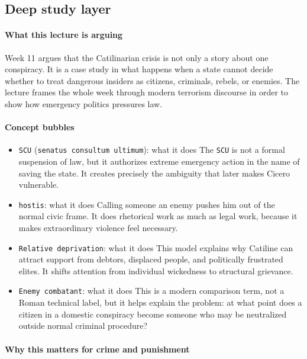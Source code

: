 \documentclass[11pt]{article}
\begin{document}
\subsection{Deep study layer}

\paragraph{What this lecture is arguing}

Week 11 argues that the Catilinarian crisis is not only a story about one conspiracy. It is a case study in what happens when a state cannot decide whether to treat dangerous insiders as citizens, criminals, rebels, or enemies. The lecture frames the whole week through modern terrorism discourse in order to show how emergency politics pressures law.

\paragraph{Concept bubbles}

\begin{itemize}
\item \texttt{SCU} (\texttt{senatus consultum ultimum}): what it does The \texttt{SCU} is not a formal suspension of law, but it authorizes extreme emergency action in the name of saving the state. It creates precisely the ambiguity that later makes Cicero vulnerable.
\item \texttt{hostis}: what it does Calling someone an enemy pushes him out of the normal civic frame. It does rhetorical work as much as legal work, because it makes extraordinary violence feel necessary.
\item \texttt{Relative deprivation}: what it does This model explains why Catiline can attract support from debtors, displaced people, and politically frustrated elites. It shifts attention from individual wickedness to structural grievance.
\item \texttt{Enemy combatant}: what it does This is a modern comparison term, not a Roman technical label, but it helps explain the problem: at what point does a citizen in a domestic conspiracy become someone who may be neutralized outside normal criminal procedure?
\end{itemize}

\paragraph{Why this matters for crime and punishment}
\end{document}
